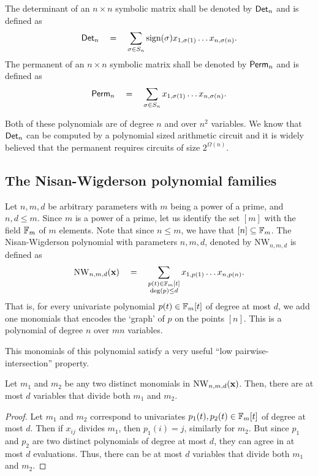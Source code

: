 The determinant of an $n\times n$ symbolic matrix shall be denoted by $\operatorname{\mathsf{Det}}_n$ and is defined as
\[
\operatorname{\mathsf{Det}}_n \quad = \quad \sum_{\sigma \in S_n} \text{sign}(\sigma) x_{1,\sigma(1)}\dots x_{n,\sigma(n)}.
\]
The permanent of an $n\times n$ symbolic matrix shall be denoted by $\operatorname{\mathsf{Perm}}_n$ and is defined as
\[
\operatorname{\mathsf{Perm}}_n \quad = \quad \sum_{\sigma \in S_n}x_{1,\sigma(1)}\dots x_{n,\sigma(n)}.
\]

Both of these polynomials are of degree $n$ and over $n^2$ variables. 
We know that $\operatorname{\mathsf{Det}}_n$ can be computed by a polynomial sized arithmetic circuit and it is widely believed that the permanent requires circuits of size $2^{\Omega(n)}$. 

\subsection*{The Nisan-Wigderson polynomial families}

\begin{definition}\label{defn:NW-polyfamilies}
Let $n,m,d$ be arbitrary parameters with $m$ being a power of a prime, and $n,d\leq m$. 
Since $m$ is a power of a prime, let us identify the set $[m]$ with the field $\mathbb{F}_m$ of $m$ elements. 
Note that since $n \leq m$, we have that $[n] \subseteq \mathbb{F}_m$. 
The Nisan-Wigderson polynomial with parameters $n,m,d$, denoted by $\mathrm{NW}_{n,m,d}$ is defined as
\[
\operatorname{\mathrm{NW}}_{n,m,d}(\mathbf{x}) \quad = \quad \sum_{\substack{p(t) \in \mathbb{F}_m[t]\\ \deg(p) \leq d}} x_{1,p(1)}\dots x_{n,p(n)}.
\]
That is, for every univariate polynomial $p(t) \in \mathbb{F}_m[t]$ of degree at most $d$, we add one monomials that encodes the `graph' of $p$ on the points $[n]$. 
This is a polynomial of degree $n$ over $mn$ variables.
\end{definition}


This monomials of this polynomial satisfy a very useful ``low pairwise-intersection'' property. 

\begin{lemma}\label{lem:NW-low-intersection}
Let $m_1$ and $m_2$ be any two distinct monomials in $\operatorname{\mathrm{NW}}_{n,m,d}(\mathbf{x})$. 
Then, there are at most $d$ variables that divide both $m_1$ and $m_2$. 
\end{lemma}
\begin{proof}
Let $m_1$ and $m_2$ correspond to univariates $p_1(t), p_2(t) \in \mathbb{F}_m[t]$ of degree at most $d$. 
Then if $x_{ij}$ divides $m_1$, then $p_1(i) = j$, similarly for $m_2$.
But since $p_1$ and $p_2$ are two distinct polynomials of degree at most $d$, they can agree in at most $d$ evaluations. 
Thus, there can be at most $d$ variables that divide both $m_1$ and $m_2$.
\end{proof}


